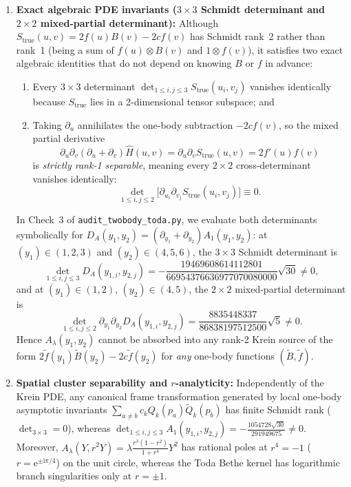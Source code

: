 \documentclass[11pt,a4paper]{article}
\newcommand{\ii}{\mathrm{i}}
\newcommand{\ee}{\mathrm{e}}
\begin{document}
\begin{enumerate}[leftmargin=2em]
  \item \textbf{Exact algebraic PDE invariants ($3\times 3$ Schmidt determinant and $2\times 2$ mixed-partial determinant):}
  Although $S_{\mathrm{true}}(u,v)=2f(u)B(v)-2cf(v)$ has Schmidt rank~2 rather than rank~1 (being a sum of $f(u)\otimes B(v)$ and $1\otimes f(v)$), it satisfies two exact algebraic identities that do not depend on knowing $B$ or $f$ in advance:
  \begin{enumerate}[label=(\alph*)]
    \item Every $3\times 3$ determinant $\det_{1\le i,j\le 3} S_{\mathrm{true}}(u_i,v_j)$ vanishes identically because $S_{\mathrm{true}}$ lies in a 2-dimensional tensor subspace; and
    \item Taking $\partial_u$ annihilates the one-body subtraction $-2cf(v)$, so the mixed partial derivative
    \[
      \partial_u\partial_v(\partial_u+\partial_v)\widehat{H}(u,v) = \partial_u\partial_v S_{\mathrm{true}}(u,v) = 2f'(u)f(v)
    \]
    is \emph{strictly rank-1 separable}, meaning every $2\times 2$ cross-determinant vanishes identically:
    \[
      \det_{1\le i,j\le 2}\bigl[\partial_{u_i}\partial_{v_j} S_{\mathrm{true}}(u_i,v_j)\bigr] \equiv 0.
    \]
  \end{enumerate}
  In Check~3 of \texttt{audit\_twobody\_toda.py}, we evaluate both determinants symbolically for $D_A(y_1,y_2)=(\partial_{y_1}+\partial_{y_2})A_1(y_1,y_2)$: at $(y_1)\in(1,2,3)$ and $(y_2)\in(4,5,6)$, the $3\times 3$ Schmidt determinant is
  \[
    \det_{1\le i,j\le 3} D_A(y_{1,i},y_{2,j}) = -\frac{19469608614112801}{66954376636977070080000}\sqrt{30} \neq 0,
  \]
  and at $(y_1)\in(1,2)$, $(y_2)\in(4,5)$, the $2\times 2$ mixed-partial determinant is
  \[
    \det_{1\le i,j\le 2} \partial_{y_1}\partial_{y_2}D_A(y_{1,i},y_{2,j}) = \frac{8835448337}{86838197512500}\sqrt{5} \neq 0.
  \]
  Hence $A_\lambda(y_1,y_2)$ cannot be absorbed into any rank-2 Krein source of the form $2\tilde{f}(y_1)\tilde{B}(y_2)-2c\tilde{f}(y_2)$ for \emph{any} one-body functions $(\tilde{B},\tilde{f})$.

  \item \textbf{Spatial cluster separability and $r$-analyticity:}
  Independently of the Krein PDE, any canonical frame transformation generated by local one-body asymptotic invariants $\sum_{a\neq b} c_k Q_k(p_a)\tilde{Q}_k(p_b)$ has finite Schmidt rank ($\det_{3\times 3}=0$), whereas $\det_{1\le i,j\le 3} A_1(y_{1,i},y_{2,j}) = -\frac{1054728\sqrt{30}}{291949675}\neq 0$. Moreover, $A_\lambda(Y,r^2Y)=\lambda\frac{r^3(1-r^2)}{1+r^4}Y^2$ has rational poles at $r^4=-1$ ($r=\ee^{\pm\ii\pi/4}$) on the unit circle, whereas the Toda Bethe kernel has logarithmic branch singularities only at $r=\pm 1$.
\end{enumerate}
\end{document}
